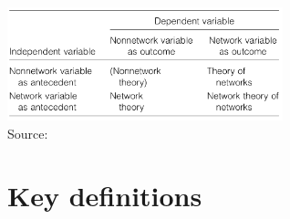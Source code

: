 \documentclass[8pt]{beamer}
\begin{document}

\begin{frame}
\frametitle{\insertsection}

\centering
\includegraphics[width=8cm]{borgatti}\\
\tiny{Source: \cite{Borgatti2011}}
\end{frame}




\section{Key definitions}

\bgroup
{}
\begin{frame}[plain]{}
\begin{center}
\color{white}{\Huge\insertsection}
\end{center}
\end{frame}
\egroup

\end{document}
